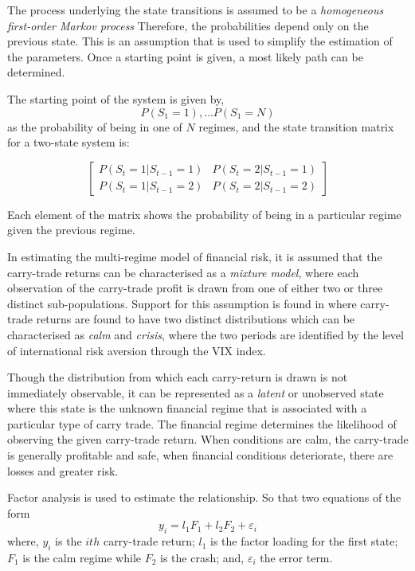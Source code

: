 \documentclass[12pt, a4paper, oneside]{article} %
\begin{document}
The process underlying the state transitions is assumed to be a \emph{homogeneous first-order Markov process}  Therefore, the probabilities depend only on the previous state. This is an assumption that is used to simplify the estimation of the parameters. Once a starting point is given, a most likely path can be determined. 


The starting point of the system is given by,
\begin{equation*}
P(S_1 = 1), \dots P(S_1 = N)
\end{equation*}
as the probability of being in one of $N$ regimes, and the state transition matrix for a two-state system is:

\begin{equation*}
\begin{bmatrix}
P(S_t = 1|S_{t-1}=1)  & P(S_t = 2|S_{t-1}=1)\\
P(S_t = 1|S_{t-1}=2)  & P(S_t = 2|S_{t-1}=2)
\end{bmatrix}
\end{equation*}

Each element of the matrix shows the probability of being in a particular regime given the previous regime. 

In estimating the multi-regime model of financial risk, it is assumed that the carry-trade returns can be characterised as a \emph{mixture model}, where each observation of the carry-trade profit is drawn from one of either two or three distinct sub-populations.   Support for this assumption is found in \citet{Hayward2013} where carry-trade returns are found to have two distinct distributions which can be characterised as \emph{calm} and \emph{crisis}, where the two periods are identified by the level of international risk aversion through the VIX index. 

Though the distribution from which each carry-return is drawn is not immediately observable, it can be represented as a \emph{latent} or unobserved state where this state is the unknown financial regime that is associated with a particular type of carry trade.  The financial regime determines the likelihood of observing the given carry-trade return.  When conditions are calm, the carry-trade is generally profitable and safe, when financial conditions deteriorate, there are losses and greater risk. 

Factor analysis is used to estimate the relationship.  So that two equations of the form 
\begin{equation}
y_i = l_1F_1 + l_2F_2 + \varepsilon_i
\end{equation}
where, $y_i$ is the $ith$ carry-trade return; $l_1$ is the factor loading for the first state;  $F_1$ is the calm regime while $F_2$ is the crash; and, $\varepsilon_i$ the error term.  
\end{document}
